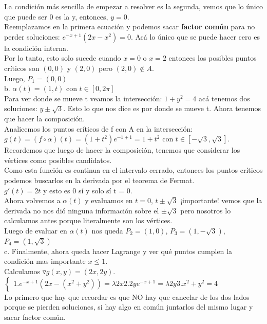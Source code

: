 \documentclass[10pt,a4paper]{article}
\begin{document}
La condición más sencilla de empezar a resolver es la segunda, vemos que lo único que puede ser 0 es la y, entonces, $y = 0$. \\
Reemplazamos en la primera ecuación y podemos sacar \textbf{factor común} para no perder soluciones: $e^{-x+1}(2x-x^{2}) = 0$. Acá lo único que se puede hacer cero es la condición interna. \\
Por lo tanto, esto solo sucede cuando $x=0$ o $x=2$ entonces los posibles puntos críticos son $(0,0)$ y $(2,0)$ pero $(2,0) \notin A$. \\
Luego, $P_{1} = (0,0)$ \\
b. $\alpha(t) = (1,t)$ con $ t \in [0, 2\pi]$ \\
Para ver donde se mueve t veamos la intersección: $1+y^{2} = 4$ acá tenemos dos soluciones: $ y \pm \sqrt{3}$. Esto lo que nos dice es por donde se mueve t. Ahora tenemos que hacer la composición. \\
Analicemos los puntos críticos de f con A en la intersección: $g(t) = (f \circ \alpha)(t) = (1+t^{2})e^{-1+1} = 1 + t^{2}$ con $t \in [-\sqrt{3}, \sqrt{3}]$. \\
Recordemos que luego de hacer la composición, tenemos que considerar los vértices como posibles candidatos. \\
Como esta función es continua en el intervalo cerrado, entonces los puntos críticos podemos buscarlos en la derivada por el teorema de Fermat. \\
$g'(t) = 2t$ y esto es 0 sí y solo sí t = 0. \\
Ahora volvemos a $\alpha(t)$ y evaluamos en $t=0$, $t \pm \sqrt{3}$ ¡importante! vemos que la derivada no nos dió ninguna información sobre el $\pm \sqrt{3}$ pero nosotros lo calculamos antes porque literalmente son los vértices. \\
Luego de evaluar en $\alpha(t)$ nos queda $P_{2} = (1,0)$, $P_{3} = (1, -\sqrt{3})$, $P_{4} = (1, \sqrt{3})$ \\
c. Finalmente, ahora queda hacer Lagrange y ver qué puntos cumplen la condición mas importante $x \le 1$. \\
Calculamos $\triangledown g(x,y) = (2x, 2y)$. \\
$
\begin{cases}
    1. e^{-x+1}(2x-(x^{2}+ y^{2})) = \lambda 2x 
    2. 2ye^{-x+1} = \lambda 2y 
    3. x^{2} + y^{2} = 4  
\end{cases}
$ \\
Lo primero que hay que recordar es que NO hay que cancelar de los dos lados porque se pierden soluciones, si hay algo en común juntarlos del mismo lugar y sacar factor común. \\
\end{document}

